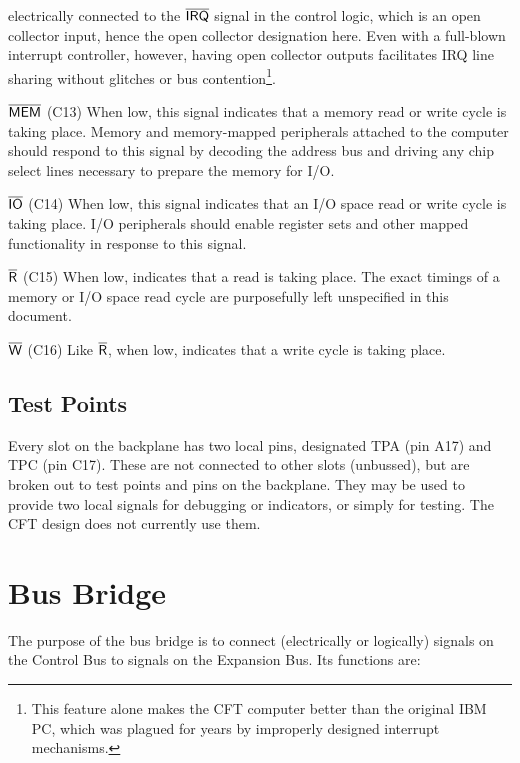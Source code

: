 \documentclass[11pt,a4paper,twocolumns]{article}
\newcommand{\ns}[1]{$\overline{\mbox{\textsf{{#1}}}}$}
\newcommand{\ps}[1]{\textsf{#1}}
\newcommand\IRQ{\ns{IRQ}}
\newcommand\TPA{\ps{TPA}}
\newcommand\TPC{\ps{TPC}}
\newcommand\MEM{\ns{MEM}}
\newcommand\IO{\ns{IO}}
\newcommand\WRITE{\ns{W}}
\newcommand\READ{\ns{R}}
\begin{document}
\begin{description}
  electrically connected to the \IRQ{} signal in the control logic,
  which is an open collector input, hence the open collector
  designation here. Even with a full-blown interrupt controller,
  however, having open collector outputs facilitates IRQ line sharing
  without glitches or bus contention\footnote{This feature alone makes
    the CFT computer better than the original IBM PC, which was
    plagued for years by improperly designed interrupt mechanisms.}.
\item{\bf \MEM} (C13) When low, this signal indicates that a memory
  read or write cycle is taking place. Memory and memory-mapped
  peripherals attached to the computer should respond to this signal
  by decoding the address bus and driving any chip select lines
  necessary to prepare the memory for I/O.
\item{\bf \IO} (C14) When low, this signal indicates that an I/O space
  read or write cycle is taking place. I/O peripherals should enable
  register sets and other mapped functionality in response to this
  signal.
\item{\bf \READ} (C15) When low, indicates that a read is taking
  place. The exact timings of a memory or I/O space read cycle are
  purposefully left unspecified in this document.
\item{\bf \WRITE} (C16) Like \READ, when low, indicates that a write
  cycle is taking place.
\end{description}

\subsection{Test Points}

Every slot on the backplane has two local pins, designated \TPA{} (pin
A17) and \TPC{} (pin C17). These are not connected to other slots
(unbussed), but are broken out to test points and pins on the
backplane. They may be used to provide two local signals for debugging
or indicators, or simply for testing. The CFT design does not
currently use them.

\section{Bus Bridge}

The purpose of the bus bridge is to connect (electrically or
logically) signals on the Control Bus to signals on the Expansion
Bus. Its functions are:
\end{document}
